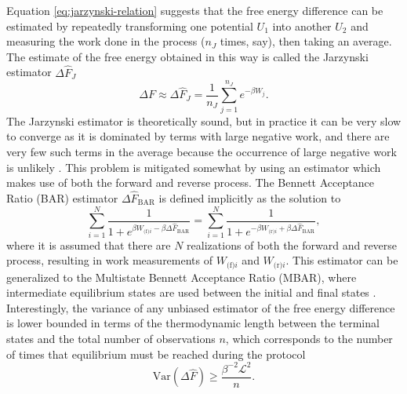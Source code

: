 \documentclass[prx,onecolumn,floatfix,longbibliography,notitlepage, nofootinbib,12pt]{revtex4-2}
\renewcommand{\geq}{\geqslant}
\begin{document}
\begin{appendix}
Equation \eqref{eq:jarzynski-relation} suggests that the free energy difference can be estimated by repeatedly transforming one potential $U_1$ into another $U_2$ and measuring the work done in the process ($n_J$ times, say), then  taking an average. The estimate of the free energy obtained in this way is called the Jarzynski estimator $\Delta \hat{F}_J$
\begin{equation}
    \Delta F \approx \Delta \hat{F}_J = \frac{1}{n_J}\sum_{j=1}^{n_J} e^{-\beta W_j}.
\end{equation}
The Jarzynski estimator is theoretically sound, but in practice it can be very slow to converge as it is dominated by terms with large negative work, and there are very few such terms in the average because the occurrence of large negative work is unlikely \cite{jarzynski2006rare}. This problem is mitigated somewhat by using an estimator which makes use of both the forward and reverse process. The Bennett Acceptance Ratio (BAR) estimator $\Delta \hat{F}_\text{BAR}$ is defined implicitly as the solution to \cite{shirts2003equilibrium, bennett1976efficient}
\begin{equation}
   \sum_{i=1}^{N} \frac{1}{1 +  e^{ \beta W_{\text{(f)}i} - \beta \Delta \hat{F}_\text{BAR}}}  =   \sum_{i=1}^{N} \frac{1}{1 +  e^{ -\beta W_{\text{(r)}i} +\beta \Delta \hat{F}_\text{BAR}}},
\end{equation}
where it is assumed that there are $N$ realizations of both the forward and reverse process, resulting in work measurements of $W_{\text{(f)}i}$ and $W_{\text{(r)}i}$. This estimator can be generalized to the Multistate Bennett Acceptance Ratio \cite{shirts2008statistically} (MBAR), where intermediate equilibrium states are used between the initial and final states \cite{shirts2008statistically}. Interestingly, the variance of any unbiased estimator of the free energy difference is lower bounded in terms of the thermodynamic length between the terminal states and the total number of observations $n$, which corresponds to the number of times that equilibrium must be reached during the protocol \cite{shenfeld2009minimizing}
\begin{equation}
    \text{Var}(\Delta \hat{F}) \geq \frac{\beta^{-2} \mathcal{L}^2}{n}.
\end{equation}


















\end{appendix}
\end{document}

